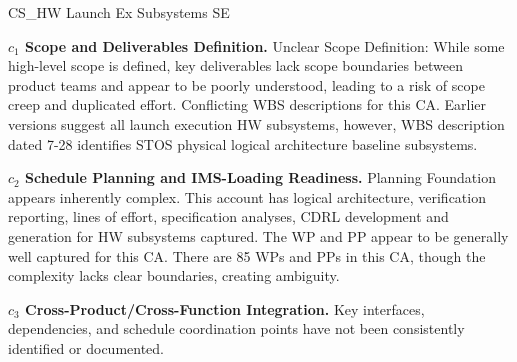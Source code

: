 \begin{frame}{CS\_HW Launch Ex Subsystems SE}
\begin{minipage}{0.90\textwidth}
\raggedright
\fontsize{8}{9.5}\selectfont
\textbf{\(c_1\) Scope and Deliverables Definition.}
Unclear Scope Definition: While some high-level scope is defined, key deliverables lack scope boundaries between product teams and appear to be poorly understood, leading to a risk of scope creep and duplicated effort. Conflicting WBS descriptions for this CA. Earlier versions suggest all launch execution HW subsystems, however, WBS description dated 7-28 identifies STOS physical logical architecture baseline subsystems.\par\vspace{0.6em}
\textbf{\(c_2\) Schedule Planning and IMS-Loading Readiness.}
Planning Foundation appears inherently complex. This account has logical architecture, verification reporting, lines of effort, specification analyses, CDRL development and generation for HW subsystems captured. The WP and PP appear to be generally well captured for this CA. There are 85 WPs and PPs in this CA, though the complexity lacks clear boundaries, creating ambiguity.\par\vspace{0.6em}
\textbf{\(c_3\) Cross-Product/Cross-Function Integration.}
Key interfaces, dependencies, and schedule coordination points have not been consistently identified or documented.\par\vspace{0.6em}
\end{minipage}
\end{frame}

\endinput
